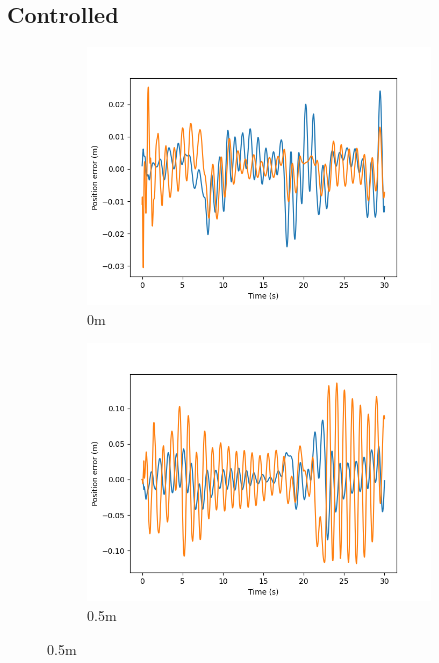 \documentclass[class=article, crop=false]{standalone}
\begin{document}
\subsection{Controlled}
\begin{figure}
    \centering
    \begin{subfigure}[b]{0.48\textwidth}
        \centering
        \includegraphics{scenario1/rov-0m/0.0m/rov_position_error_controlled}
        \caption{0m}
        \label{}
    \end{subfigure}
    \hfill
    \begin{subfigure}[b]{0.48\textwidth}
        \centering
        \includegraphics{scenario1/rov-0m/0.5m/rov_position_error_controlled}
        \caption{0.5m}

\end{subfigure}
\end{figure}
\end{document}
